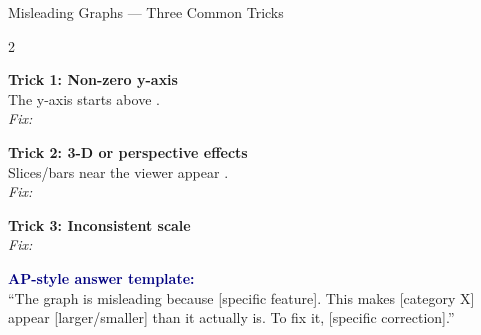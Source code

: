 \documentclass[10pt]{article}
\begin{document}
\begin{notesbox}{Misleading Graphs --- Three Common Tricks}
\small

\begin{multicols}{2}

\textbf{Trick 1: Non-zero y-axis}\\
The y-axis starts above .\\[4pt]
\textit{Fix:} 

\vspace{8pt}
\textbf{Trick 2: 3-D or perspective effects}\\
Slices/bars near the viewer appear .\\[4pt]
\textit{Fix:} 

\columnbreak

\textbf{Trick 3: Inconsistent scale}\\
\textit{Fix:} 

\vspace{8pt}
\textbf{\textcolor{navy}{AP-style answer template:}}\\[4pt]
``The graph is misleading because [specific feature]. This makes [category X]
appear [larger/smaller] than it actually is. To fix it, [specific correction].''

\end{multicols}
\end{notesbox}

\vspace{0.1in}
\end{document}
